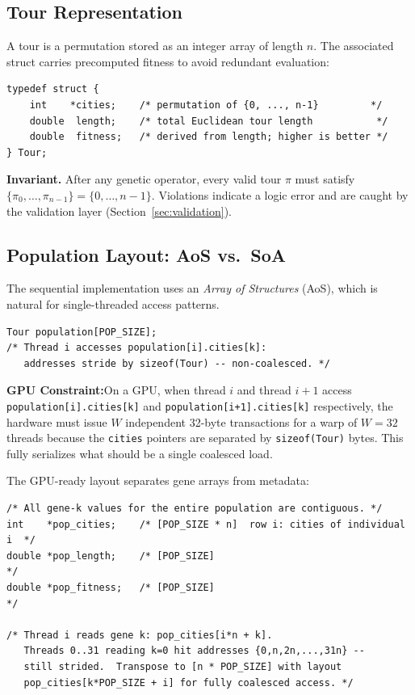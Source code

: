 \documentclass[11pt, letterpaper]{article}
\newcommand{\warn}[1]{%
  \vspace{0.4em}
  \noindent\colorbox{orange!10}{\parbox{\dimexpr\linewidth-2\fboxsep}{%
    \footnotesize\textbf{GPU Constraint:}\enspace #1
  }}
  \vspace{0.4em}
}
\begin{document}
\subsection{Tour Representation}

A tour is a permutation stored as an integer array of length $n$.  The
associated struct carries precomputed fitness to avoid redundant evaluation:

\begin{lstlisting}[caption={Sequential tour struct (AoS element).}]
typedef struct {
    int    *cities;    /* permutation of {0, ..., n-1}         */
    double  length;    /* total Euclidean tour length           */
    double  fitness;   /* derived from length; higher is better */
} Tour;
\end{lstlisting}

\textbf{Invariant.}  After any genetic operator, every valid tour $\pi$ must
satisfy $\{\pi_0, \dots, \pi_{n-1}\} = \{0, \dots, n-1\}$.  Violations
indicate a logic error and are caught by the validation layer
(Section~\ref{sec:validation}).

\subsection{Population Layout: AoS vs.\ SoA}
\label{sec:layout}

The sequential implementation uses an \emph{Array of Structures} (AoS), which
is natural for single-threaded access patterns.

\begin{lstlisting}[caption={AoS: simple but GPU-hostile.}]
Tour population[POP_SIZE];
/* Thread i accesses population[i].cities[k]:
   addresses stride by sizeof(Tour) -- non-coalesced. */
\end{lstlisting}

\warn{On a GPU, when thread $i$ and thread $i+1$ access \texttt{population[i].cities[k]}
and \texttt{population[i+1].cities[k]} respectively, the hardware must issue
$W$ independent 32-byte transactions for a warp of $W=32$ threads because the
\texttt{cities} pointers are separated by \texttt{sizeof(Tour)} bytes.  This
fully serializes what should be a single coalesced load.}

The GPU-ready layout separates gene arrays from metadata:

\begin{lstlisting}[caption={SoA: GPU-friendly, migration target.}]
/* All gene-k values for the entire population are contiguous. */
int    *pop_cities;    /* [POP_SIZE * n]  row i: cities of individual i  */
double *pop_length;    /* [POP_SIZE]                                      */
double *pop_fitness;   /* [POP_SIZE]                                      */

/* Thread i reads gene k: pop_cities[i*n + k].
   Threads 0..31 reading k=0 hit addresses {0,n,2n,...,31n} --
   still strided.  Transpose to [n * POP_SIZE] with layout
   pop_cities[k*POP_SIZE + i] for fully coalesced access. */
\end{lstlisting}
\end{document}
